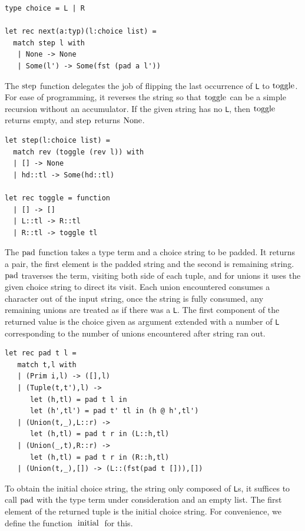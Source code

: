 \documentclass[a4paper,english]{lipics-v2019}
\renewcommand{\L}{{\tt L}\xspace}
\newcommand{\Ls}{{\tt L}s\xspace}
\renewcommand{\c}[1]{\ensuremath{\text{\lstinline{#1}}}\xspace}
\begin{document}
\begin{lstlisting}
type choice = L | R

let rec next(a:typ)(l:choice list) = 
  match step l with
   | None -> None
   | Some(l') -> Some(fst (pad a l'))
\end{lstlisting}

\noindent
The \c{step} function delegates the job of flipping the last occurrence of
\L to \c{toggle}. For ease of programming, it reverses the string so that
\c{toggle} can be a simple recursion without an accumulator.  If the given
string has no \L, then \c{toggle} returns empty, and \c{step} returns
\c{None}.
\newpage

\begin{lstlisting}
let step(l:choice list) =
  match rev (toggle (rev l)) with
  | [] -> None
  | hd::tl -> Some(hd::tl)

let rec toggle = function
  | [] -> []    
  | L::tl -> R::tl
  | R::tl -> toggle tl
\end{lstlisting}

\noindent
The \c{pad} function takes a type term and a choice string to be padded. It
returns a pair, the first element is the padded string and the second is
remaining string. \c{pad} traverses the term, visiting both side of each
tuple, and for unions it uses the given choice string to direct its visit.
Each union encountered consumes a character out of the input string, once
the string is fully consumed, any remaining unions are treated as if there
was a \L. The first component of the returned value is the choice given as
argument extended with a number of \L corresponding to the number of unions
encountered after string ran out.

\begin{lstlisting}
let rec pad t l =
   match t,l with
   | (Prim i,l) -> ([],l)
   | (Tuple(t,t'),l) -> 
      let (h,tl) = pad t l in
      let (h',tl') = pad t' tl in (h @ h',tl')
   | (Union(t,_),L::r) -> 
      let (h,tl) = pad t r in (L::h,tl)
   | (Union(_,t),R::r) -> 
      let (h,tl) = pad t r in (R::h,tl)
   | (Union(t,_),[]) -> (L::(fst(pad t [])),[])
\end{lstlisting}

\noindent
To obtain the initial choice string, the string only composed of \Ls, it
suffices to call \c{pad} with the type term under consideration and an empty
list. The first element of the returned tuple is the initial choice
string. For convenience, we define the function \c{initial} for this.
\end{document}
